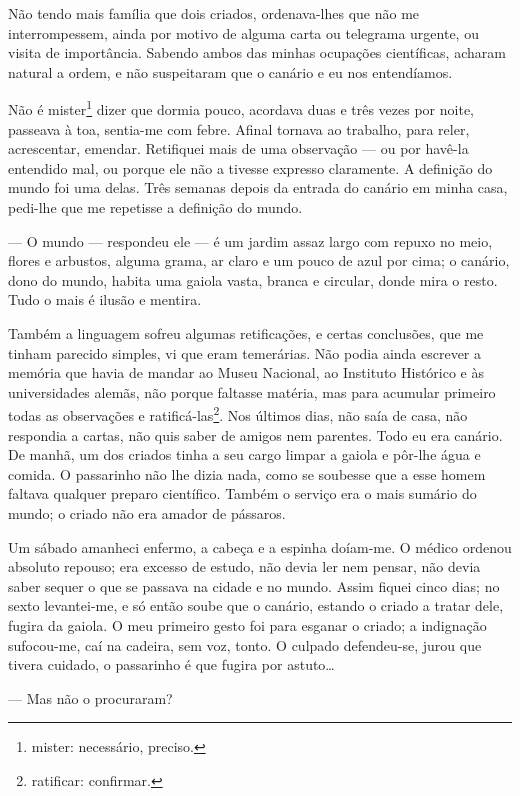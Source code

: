Não tendo mais família que dois criados, ordenava-lhes que não me
interrompessem, ainda por motivo de alguma carta ou telegrama urgente,
ou visita de importância. Sabendo ambos das minhas ocupações
científicas, acharam natural a ordem, e não suspeitaram que o canário e
eu nos entendíamos.

Não é mister\footnote{mister: necessário, preciso.} dizer que dormia
pouco, acordava duas e três vezes por noite, passeava à toa, sentia-me
com febre. Afinal tornava ao trabalho, para reler, acrescentar, emendar.
Retifiquei mais de uma observação --- ou por havê-la entendido mal, ou
porque ele não a tivesse expresso claramente. A definição do mundo foi
uma delas. Três semanas depois da entrada do canário em minha casa,
pedi-lhe que me repetisse a definição do mundo.

--- O mundo --- respondeu ele --- é um jardim assaz largo com repuxo no
meio, flores e arbustos, alguma grama, ar claro e um pouco de azul por
cima; o canário, dono do mundo, habita uma gaiola vasta, branca e
circular, donde mira o resto. Tudo o mais é ilusão e mentira.

Também a linguagem sofreu algumas retificações, e certas conclusões, que
me tinham parecido simples, vi que eram temerárias. Não podia ainda
escrever a memória que havia de mandar ao Museu Nacional, ao Instituto
Histórico e às universidades alemãs, não porque faltasse matéria, mas
para acumular primeiro todas as observações e ratificá-las\footnote{ratificar:
  confirmar.}. Nos últimos dias, não saía de casa, não respondia a
cartas, não quis saber de amigos nem parentes. Todo eu era canário. De
manhã, um dos criados tinha a seu cargo limpar a gaiola e pôr-lhe água e
comida. O passarinho não lhe dizia nada, como se soubesse que a esse
homem faltava qualquer preparo científico. Também o serviço era o mais
sumário do mundo; o criado não era amador de pássaros.

Um sábado amanheci enfermo, a cabeça e a espinha doíam-me. O médico
ordenou absoluto repouso; era excesso de estudo, não devia ler nem
pensar, não devia saber sequer o que se passava na cidade e no mundo.
Assim fiquei cinco dias; no sexto levantei-me, e só então soube que o
canário, estando o criado a tratar dele, fugira da gaiola. O meu
primeiro gesto foi para esganar o criado; a indignação sufocou-me, caí
na cadeira, sem voz, tonto. O culpado defendeu-se, jurou que tivera
cuidado, o passarinho é que fugira por astuto\ldots{}

--- Mas não o procuraram?

